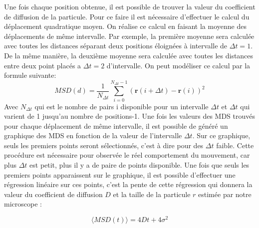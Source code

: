 \documentclass[conference]{IEEEtran}
\begin{document}
Une fois chaque position obtenue, il est possible de trouver la valeur du coefficient de diffusion de la particule. 
Pour ce faire il est nécessaire d'effectuer le calcul du déplacement quadratique moyen. On réalise ce calcul en faisant la moyenne des déplacements de même intervalle. Par exemple, 
la première moyenne sera calculée avec toutes les distances séparant deux positions éloignées à intervalle de $\Delta t=1$. De la même manière, la deuxième moyenne sera calculée avec toutes les distances
entre deux point placés a $\Delta t=2$ d'intervalle. On peut modéliser ce calcul par la formule suivante: 
\begin{equation}
  MSD(d) = \frac{1}{N_{\Delta t}} \sum_{i=0}^{N_{\Delta t} - 1} \left( \mathbf{r}(i+\Delta t) - \mathbf{r}(i) \right)^2
\end{equation}
Avec $N_{\Delta t}$ qui est le nombre de pairs i disponible pour un intervalle $\Delta t$ et $\Delta t$ qui varient de 1 jusqu'au nombre de positions-1. 
Une fois les valeurs des MDS trouvés pour chaque déplacement de même intervalle, il est possible de généré un graphique 
des MDS en fonction de la valeur de l'intervalle $\Delta t$. Sur ce graphique, seuls les premiers points seront sélectionnés, c'est à dire pour des $\Delta t$ faible.
Cette procédure est nécessaire pour observée le réel comportement du mouvement, car plus $\Delta t$ est petit, plus il y a de paire de points disponible. 
Une fois que seuls les premiers points apparaissent sur le graphique, il est possible d'effectuer une régression linéaire sur
ces points, c'est la pente de cette régression qui donnera la valeur du coefficient de diffusion $D$ et la taille de la particule $r$ estimée par notre microscope :

\begin{equation}
  \langle MSD(t) \rangle = 4Dt + 4\sigma^{2}
\end{equation}
\end{document}
